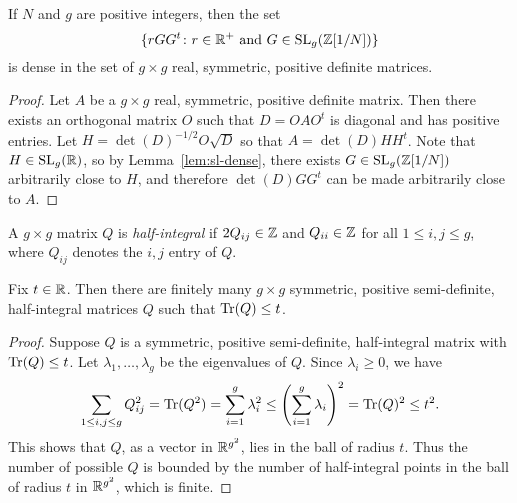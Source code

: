 \documentclass{amsart}
\begin{document}
\begin{lemma}\label{lem:rggt-dense}
  If $N$ and $g$ are positive integers, then the set
\[
\{ rGG^t \colon r \in \mathbb{R}^+ \text{ and } G \in \operatorname{SL}_g(\mathbb{Z}[1/N]) \}
\]
is dense in the set of $g \times g$ real, symmetric, positive definite matrices.
\end{lemma}
\begin{proof}
  Let $A$ be a $g \times g$ real, symmetric, positive definite matrix. Then there exists an orthogonal matrix $O$ such that $D = OAO^t$ is diagonal and has positive entries. Let $H = \det(D)^{-1/2}O\sqrt{D}$ so that $A = \det(D)HH^t$. Note that $H \in \operatorname{SL}_g(\mathbb{R})$, so by Lemma~\ref{lem:sl-dense}, there exists $G \in \operatorname{SL}_g(\mathbb{Z}[1/N])$ arbitrarily close to $H$, and therefore $\det(D)GG^t$ can be made arbitrarily close to $A$.
\end{proof}

\begin{definition}
  A $g \times g$ matrix $Q$ is \emph{half-integral} if $2Q_{ij} \in \mathbb{Z}$ and $Q_{ii} \in \mathbb{Z}$ for all $1 \leq i,j \leq g$, where $Q_{ij}$ denotes the $i,j$ entry of $Q$.
\end{definition}

\begin{lemma}\label{lem:finite-fixed-trace}
 Fix $t\in\mathbb{R}$. Then there are finitely many $g \times g$ symmetric, positive semi-definite, half-integral matrices $Q$ such that $\operatorname{Tr}(Q) \leq t$.
\end{lemma}
\begin{proof}
  Suppose $Q$ is a symmetric, positive semi-definite, half-integral matrix with $\operatorname{Tr}(Q) \leq t$. Let $\lambda_1,\dots,\lambda_g$ be the eigenvalues of $Q$. Since $\lambda_i \geq 0$, we have
  \[
    \sum_{1 \leq i,j \leq g} Q_{ij}^2 = \operatorname{Tr}(Q^2) = \sum_{i=1}^g \lambda_i^2 \leq \left(\sum_{i=1}^g \lambda_i\right)^2 = \operatorname{Tr}(Q)^2 \leq t^2.
  \]
  This shows that $Q$, as a vector in $\mathbb{R}^{g^2}$, lies in the ball of radius $t$. Thus the number of possible $Q$ is bounded by the number of half-integral points in the ball of radius $t$ in $\mathbb{R}^{g^2}$, which is finite.
\end{proof}
\end{document}
